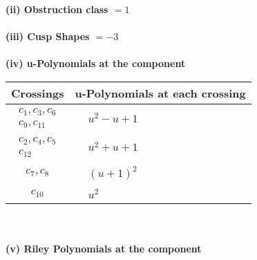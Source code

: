\documentclass[1p]{elsarticle_modified}
\theoremstyle{definition}
\begin{document}
\flushleft \textbf{(ii) Obstruction class $= 1$}\\~\\
\flushleft \textbf{(iii) Cusp Shapes $= -3$}\\~\\
\newpage\renewcommand{\arraystretch}{1}
\flushleft \textbf{(iv) u-Polynomials at the component}\newline \\
\begin{tabular}{m{50pt}|m{274pt}}
Crossings & \hspace{64pt}u-Polynomials at each crossing \\
\hline $$\begin{aligned}c_{1},c_{3},c_{6}\\c_{9},c_{11}\end{aligned}$$&$\begin{aligned}
&u^2- u+1
\end{aligned}$\\
\hline $$\begin{aligned}c_{2},c_{4},c_{5}\\c_{12}\end{aligned}$$&$\begin{aligned}
&u^2+u+1
\end{aligned}$\\
\hline $$\begin{aligned}c_{7},c_{8}\end{aligned}$$&$\begin{aligned}
&(u+1)^2
\end{aligned}$\\
\hline $$\begin{aligned}c_{10}\end{aligned}$$&$\begin{aligned}
&u^2
\end{aligned}$\\
\hline
\end{tabular}\\~\\
\newpage\renewcommand{\arraystretch}{1}
\flushleft \textbf{(v) Riley Polynomials at the component}\newline \\
\end{document}
